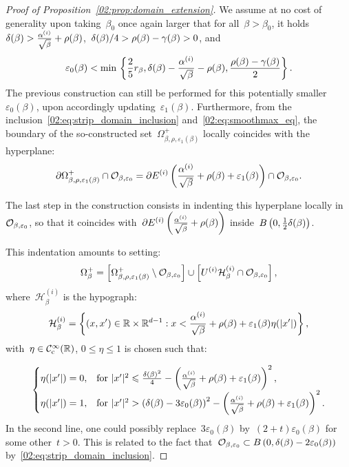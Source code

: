 \begin{proof}[Proof of Proposition~\ref{02:prop:domain_extension}]
        We assume at no cost of generality upon taking~$\beta_0$ once again larger that for all~$\beta>\beta_0$, it holds~$\delta(\beta)>\frac{\alpha^{(i)}}{\sqrt\beta}+\rho(\beta)$,~$\delta(\beta)/4>\rho(\beta)-\gamma(\beta)>0$, and
        $$\varepsilon_0(\beta)< \min\,\left\{\frac25 r_\beta,\delta(\beta)-\frac{\alpha^{(i)}}{\sqrt\beta}-\rho(\beta),\frac{\rho(\beta)-\gamma(\beta)}2\right\}.$$ 
        The previous construction can still be performed for this potentially smaller~$\varepsilon_0(\beta)$, upon accordingly updating~$\varepsilon_1(\beta)$.
        Furthermore, from the inclusion~\eqref{02:eq:strip_domain_inclusion} and~\eqref{02:eq:smoothmax_eq}, the boundary of the so-constructed set~$\Omega_{\beta,\rho,\varepsilon_1(\beta)}^+$ locally coincides with the hyperplane:
        $$\partial \Omega_{\beta,\rho,\varepsilon_1(\beta)}^{+} \cap \mathcal{O}_{\beta,\varepsilon_0} = \partial E^{(i)}\left(\frac{\alpha^{(i)}}{\sqrt\beta}+\rho(\beta) + \varepsilon_1(\beta)\right)\cap \mathcal{O}_{\beta,\varepsilon_0}.$$

        The last step in the construction consists in indenting this hyperplane locally in~$\mathcal{O}_{\beta,\varepsilon_0}$, so that it coincides with~$\partial E^{(i)}\left(\frac{\alpha^{(i)}}{\sqrt\beta}+\rho(\beta)\right)$ inside~$B\left(0,\frac12\delta(\beta)\right)$.
        
        This indentation amounts to setting:
        $$\Omega_{\beta}^+ = \left[\Omega_{\beta,\rho,\varepsilon_1(\beta)}^{+}\setminus \mathcal{O}_{\beta,\varepsilon_0}\right] \cup \left[U^{(i)}\mathcal H^{(i)}_\beta \cap \mathcal{O}_{\beta,\varepsilon_0}\right],$$
        where~$\mathcal H^{(i)}_\beta$ is the hypograph:
        \[\mathcal H^{(i)}_\beta = \left\{(x,x')\in \mathbb{R}\times \mathbb{R}^{d-1} : x < \frac{\alpha^{(i)}}{\sqrt\beta}+\rho(\beta) + \varepsilon_1(\beta)\eta(|x'|)\right\},\]     
        with~$\eta \in \mathcal{C}^\infty_{\mathrm{c}}(\mathbb{R})$, $0\leq \eta\leq 1$ is chosen such that:
        
        \begin{equation}
            \label{02:eq:indentation_cutoff}
            \begin{cases}
            \eta(|x'|)= 0,&\text{for } |x'|^2\leqslant \frac{\delta(\beta)^2}4-\left(\frac{\alpha^{(i)}}{\sqrt\beta}+\rho(\beta)+\varepsilon_1(\beta)\right)^2,\\
            \eta(|x'|) = 1, &\text{for }|x'|^2 > \left(\delta(\beta)-3\varepsilon_0(\beta)\right)^2 -\left(\frac{\alpha^{(i)}}{\sqrt\beta}+\rho(\beta)+\varepsilon_1(\beta)\right)^2.
        \end{cases}
        \end{equation}
        In the second line, one could possibly replace~$3\varepsilon_0(\beta)$ by~$(2+t)\varepsilon_0(\beta)$ for some other~$t>0$. This is related to the fact that~$\mathcal{O}_{\beta,\varepsilon_0}\subset B\left(0,\delta(\beta)-2\varepsilon_0(\beta)\right)$ by~\eqref{02:eq:strip_domain_inclusion}.


\end{proof}
